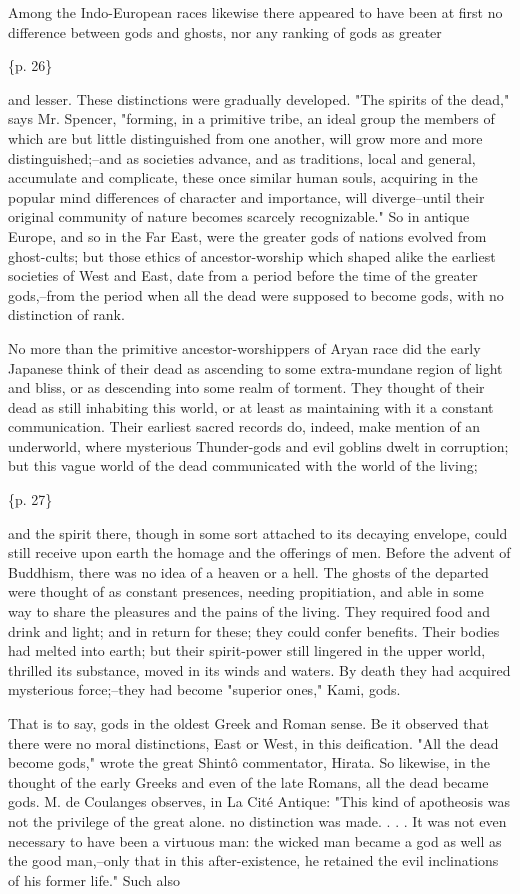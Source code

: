 Among the Indo-European races likewise there appeared to have been at first no difference between gods and ghosts, nor any ranking of gods as greater

\{p. 26\}

and lesser. These distinctions were gradually developed. "The spirits of the dead," says Mr. Spencer, "forming, in a primitive tribe, an ideal group the members of which are but little distinguished from one another, will grow more and more distinguished;--and as societies advance, and as traditions, local and general, accumulate and complicate, these once similar human souls, acquiring in the popular mind differences of character and importance, will diverge--until their original community of nature becomes scarcely recognizable." So in antique Europe, and so in the Far East, were the greater gods of nations evolved from ghost-cults; but those ethics of ancestor-worship which shaped alike the earliest societies of West and East, date from a period before the time of the greater gods,--from the period when all the dead were supposed to become gods, with no distinction of rank.

No more than the primitive ancestor-worshippers of Aryan race did the early Japanese think of their dead as ascending to some extra-mundane region of light and bliss, or as descending into some realm of torment. They thought of their dead as still inhabiting this world, or at least as maintaining with it a constant communication. Their earliest sacred records do, indeed, make mention of an underworld, where mysterious Thunder-gods and evil goblins dwelt in corruption; but this vague world of the dead communicated with the world of the living;

\{p. 27\}

and the spirit there, though in some sort attached to its decaying envelope, could still receive upon earth the homage and the offerings of men. Before the advent of Buddhism, there was no idea of a heaven or a hell. The ghosts of the departed were thought of as constant presences, needing propitiation, and able in some way to share the pleasures and the pains of the living. They required food and drink and light; and in return for these; they could confer benefits. Their bodies had melted into earth; but their spirit-power still lingered in the upper world, thrilled its substance, moved in its winds and waters. By death they had acquired mysterious force;--they had become "superior ones," Kami, gods.

That is to say, gods in the oldest Greek and Roman sense. Be it observed that there were no moral distinctions, East or West, in this deification. "All the dead become gods," wrote the great Shintô commentator, Hirata. So likewise, in the thought of the early Greeks and even of the late Romans, all the dead became gods. M. de Coulanges observes, in La Cité Antique: "This kind of apotheosis was not the privilege of the great alone. no distinction was made. . . . It was not even necessary to have been a virtuous man: the wicked man became a god as well as the good man,--only that in this after-existence, he retained the evil inclinations of his former life." Such also

